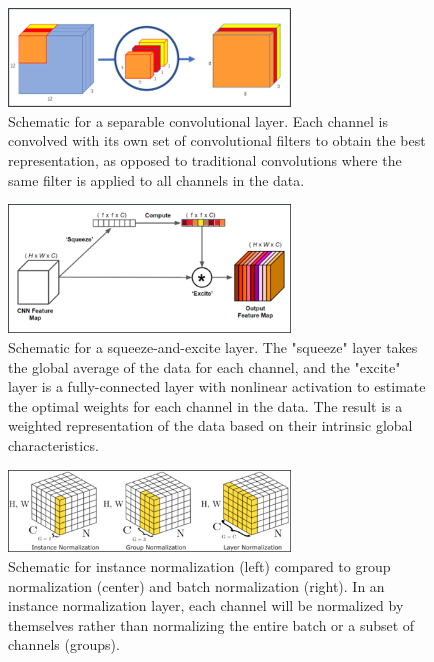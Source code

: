 \documentclass[10pt, twoside]{article}
\begin{document}
\begin{figure}[h]
    \centering
    \includegraphics[width=7.5cm]{figures/sepconv.png}
    \caption{Schematic for a separable convolutional layer. Each channel is convolved with its own set of convolutional filters to obtain the best representation, as opposed to traditional convolutions where the same filter is applied to all channels in the data.}
    \label{sepconv}
\end{figure}

\begin{figure}[h]
    \centering
    \includegraphics[width=7.5cm]{figures/squeeze-excite.png}
    \caption{Schematic for a squeeze-and-excite layer. The "squeeze" layer takes the global average of the data for each channel, and the "excite" layer is a fully-connected layer with nonlinear activation to estimate the optimal weights for each channel in the data. The result is a weighted representation of the data based on their intrinsic global characteristics.}
    \label{squeeze-excite}
\end{figure}

\begin{figure}[h]
    \centering
    \includegraphics[width=7.5cm]{figures/instance-norm.png}
    \caption{Schematic for instance normalization (left) compared to group normalization (center) and batch normalization (right). In an instance normalization layer, each channel will be normalized by themselves rather than normalizing the entire batch or a subset of channels (groups).}
    \label{instance-norm}
\end{figure}
\end{document}
